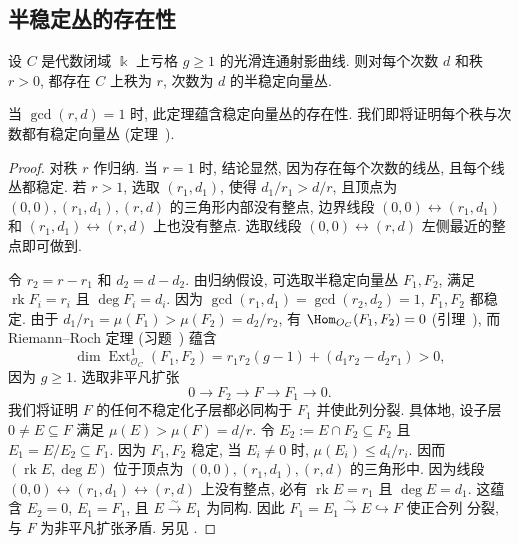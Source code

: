 \subsection{半稳定丛的存在性}\label{src:9.1.5-subsection}
\begin{theorem}[半稳定丛的存在性]\label{src:9.1.36}
设 $C$ 是代数闭域 $\Bbbk$ 上亏格 $g\geq1$ 的光滑连通射影曲线. 则对每个次数 $d$ 和秩 $r>0$, 都存在 $C$ 上秩为 $r$, 次数为 $d$ 的半稳定向量丛.
\end{theorem}
\begin{remark}\label{src:9.1.37}
当 $\gcd(r,d)=1$ 时, 此定理蕴含稳定向量丛的存在性. 我们即将证明每个秩与次数都有稳定向量丛 (定理~).
\end{remark}
\begin{proof}
对秩 $r$ 作归纳. 当 $r=1$ 时, 结论显然, 因为存在每个次数的线丛, 且每个线丛都稳定. 若 $r>1$, 选取 $(r_1,d_1)$, 使得 $d_1/r_1>d/r$, 且顶点为 $(0,0),(r_1,d_1),(r,d)$ 的三角形内部没有整点, 边界线段 $(0,0)\leftrightarrow(r_1,d_1)$ 和 $(r_1,d_1)\leftrightarrow(r,d)$ 上也没有整点. 选取线段 $(0,0)\leftrightarrow(r,d)$ 左侧最近的整点即可做到.
\begin{center}
\end{center}
令 $r_2=r-r_1$ 和 $d_2=d-d_2$. 由归纳假设, 可选取半稳定向量丛 $F_1,F_2$, 满足 $\operatorname{rk}F_i=r_i$ 且 $\deg F_i=d_i$. 因为 $\gcd(r_1,d_1)=\gcd(r_2,d_2)=1$, $F_1,F_2$ 都稳定. 由于 $d_1/r_1=\mu(F_1)>\mu(F_2)=d_2/r_2$, 有 $\Hom_{\mathcal O_C}(F_1,F_2)=0$ (引理~), 而 Riemann--Roch 定理 (习题~) 蕴含
\[
\dim\operatorname{Ext}_{\mathcal O_C}^1(F_1,F_2)
=r_1r_2(g-1)+(d_1r_2-d_2r_1)>0,
\]
因为 $g\geq1$. 选取非平凡扩张
\setcounter{theorem}{38}
\begin{equation}\label{src:9.1.39}
0\to F_2\to F\to F_1\to0.
\end{equation}
我们将证明 $F$ 的任何不稳定化子层都必同构于 $F_1$ 并使此列分裂. 具体地, 设子层 $0\ne E\subseteq F$ 满足 $\mu(E)>\mu(F)=d/r$. 令 $E_2:=E\cap F_2\subseteq F_2$ 且 $E_1=E/E_2\subseteq F_1$. 因为 $F_1,F_2$ 稳定, 当 $E_i\ne0$ 时, $\mu(E_i)\leq d_i/r_i$. 因而 $(\operatorname{rk}E,\deg E)$ 位于顶点为 $(0,0),(r_1,d_1),(r,d)$ 的三角形中. 因为线段 $(0,0)\leftrightarrow(r_1,d_1)\leftrightarrow(r,d)$ 上没有整点, 必有 $\operatorname{rk}E=r_1$ 且 $\deg E=d_1$. 这蕴含 $E_2=0$, $E_1=F_1$, 且 $E\xrightarrow{\sim}E_1$ 为同构. 因此 $F_1=E_1\xrightarrow{\sim}E\hookrightarrow F$ 使正合列  分裂, 与 $F$ 为非平凡扩张矛盾. 另见 \cite{Ari15}.
\end{proof}
